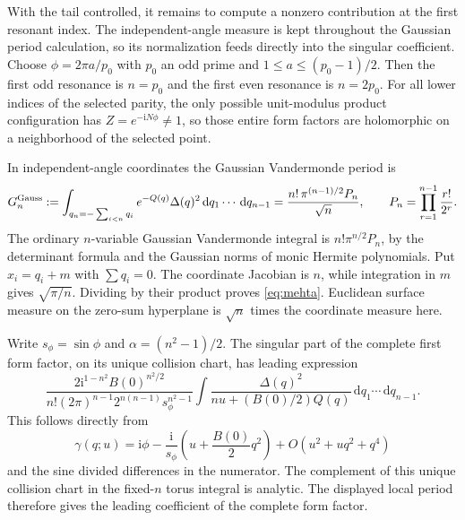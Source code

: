 \documentclass[11pt]{article}
\numberwithin{equation}{section}
\theoremstyle{definition}
\newcommand{\dd}{\,\mathrm d}
\newcommand{\ii}{\mathrm i}
\begin{document}
With the tail controlled, it remains to compute a nonzero contribution
at the first resonant index. The independent-angle measure is kept
throughout the Gaussian period calculation, so its normalization feeds
directly into the singular coefficient.
Choose $\phi=2\pi a/p_0$ with $p_0$ an odd prime and
$1\le a\le(p_0-1)/2$. Then the first odd resonance is $n=p_0$ and
the first even resonance is $n=2p_0$. For all lower indices of the
selected parity, the only possible unit-modulus product configuration
has $Z=e^{-\ii N\phi}\ne1$, so those entire form factors are
holomorphic on a neighborhood of the selected point.

In independent-angle coordinates the Gaussian Vandermonde period is
\begin{equation}\label{eq:mehta}
 G_n^{\rm Gauss}:=
 \int_{q_n=-\sum_{i<n}q_i}e^{-Q(q)}\Delta(q)^2
                         \dd q_1\cdots\dd q_{n-1}
 =\frac{n!\,\pi^{(n-1)/2}P_n}{\sqrt n},\qquad
 P_n=\prod_{r=1}^{n-1}\frac{r!}{2^r}.
\end{equation}
The ordinary $n$-variable Gaussian Vandermonde
integral is $n!\pi^{n/2}P_n$, by the determinant formula and the
Gaussian norms of monic Hermite polynomials. Put $x_i=q_i+m$ with
$\sum q_i=0$. The coordinate Jacobian is $n$, while integration in
$m$ gives $\sqrt{\pi/n}$. Dividing by their product proves
\eqref{eq:mehta}. Euclidean surface measure on the zero-sum
hyperplane is $\sqrt n$ times the coordinate measure here.

Write $s_\phi=\sin\phi$ and $\alpha=(n^2-1)/2$. The singular part
of the complete first form factor, on its unique collision chart, has
leading expression
\begin{equation}\label{eq:leadingintegral}
 \frac{2\ii^{1-n^2}B(0)^{n^2/2}}
 {n!(2\pi)^{n-1}2^{n(n-1)}s_\phi^{n^2-1}}
 \int\frac{\Delta(q)^2}{nu+(B(0)/2)Q(q)}
                                   \dd q_1\cdots\dd q_{n-1}.
\end{equation}
This follows directly from
\[
 \gamma(q;u)=\ii\phi-\frac{\ii}{s_\phi}
                  \left(u+\frac{B(0)}2q^2\right)
                  +O(u^2+u q^2+q^4)
\]
and the sine divided differences in the numerator. The complement of this unique collision chart in the fixed-$n$ torus
integral is analytic. The displayed local period therefore gives the
leading coefficient of the complete form factor.
\end{document}
